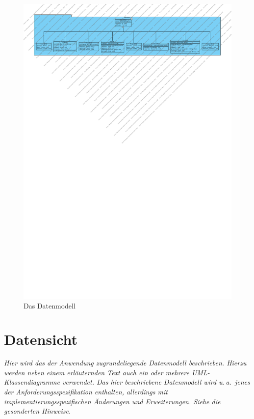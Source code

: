 \documentclass[fontsize=12pt,paper=a4,twoside]{scrartcl}
\begin{document}
\begin{figure}[H]
\begin{center}
  \includegraphics[width=\linewidth]{../GT_Modulsicht/src/Persistenz.pdf}
    \caption{Das Datenmodell}
\end{center}
\end{figure}


\section{Datensicht} \label{sec:datensicht}

{\itshape Hier wird das der Anwendung zugrundeliegende Datenmodell beschrieben. 
Hierzu werden neben einem erläuternden Text auch ein oder mehrere 
{UML}-Klassendiagramme verwendet. Das hier beschriebene Datenmodell wird u.\,a.\ 
jenes der Anforderungsspezifikation enthalten, allerdings mit 
implementierungsspezifischen Änderungen und Erweiterungen. Siehe die gesonderten
Hinweise.}
\end{document}
